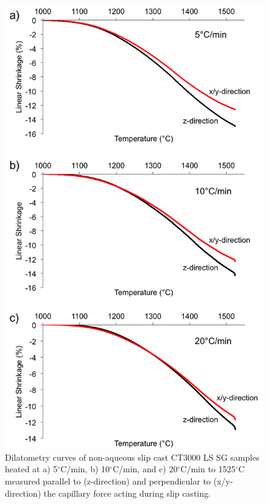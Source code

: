 \newpage
\begin{figure}[H]
	\centering
	\includegraphics[scale=0.80]{Chapter-6/Figures/Figure1.png}
	\caption{Dilatometry curves of non-aqueous slip cast CT3000 LS SG samples heated at a) 5$^{\circ}$C/min, b) 10$^{\circ}$C/min, and c) 20$^{\circ}$C/min to 1525$^{\circ}$C measured parallel to (z-direction) and perpendicular to (x/y-direction) the capillary force acting during slip casting.}
	\label{Ch6-figure:Figure1}
\end{figure}

